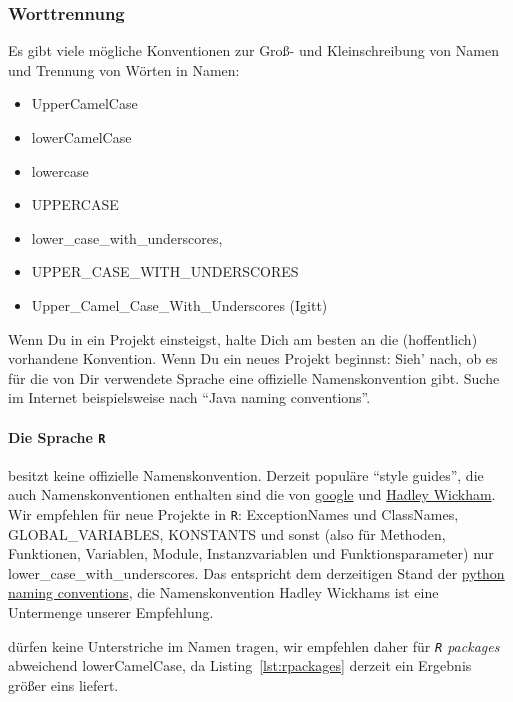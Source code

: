 \documentclass[twoside]{scrartcl}
\providecommand{\R}{\texttt{R}}
\begin{document}
\subsubsection{Worttrennung}
Es gibt viele m\"o{}gliche Konventionen zur Gro\ss{}- und Kleinschreibung  von
Namen und
Trennung von W\"o{}rten in Namen:
\begin{itemize}
\item UpperCamelCase
\item lowerCamelCase
\item lowercase
\item UPPERCASE
\item lower\_case\_with\_underscores,
\item UPPER\_CASE\_WITH\_UNDERSCORES
\item Upper\_Camel\_Case\_With\_Underscores (Igitt)
\end{itemize}
Wenn Du in ein Projekt einsteigst, halte Dich am besten an die (hoffentlich)
vorhandene Konvention.
Wenn Du ein neues Projekt beginnst: Sieh' nach, ob es f\"u{}r die von Dir 
verwendete Sprache eine offizielle Namenskonvention gibt. Suche im Internet 
beispielsweise nach "`Java naming conventions"'.

\paragraph{Die Sprache \R{}} besitzt keine offizielle
Namenskonvention. Derzeit
popul\"a{}re "`style guides"', die auch Namenskonventionen enthalten sind die
von
\href{https://google-styleguide.googlecode.com/svn/trunk/Rguide.xml}{google} und
\href{http://adv-r.had.co.nz/Style.html}{Hadley Wickham}.
Wir empfehlen f\"u{}r neue Projekte in \R{}: 
ExceptionNames und ClassNames, GLOBAL\_VARIABLES, KONSTANTS und sonst (also
f\"u{}r Methoden, Funktionen, Variablen, Module, Instanzvariablen und
Funktionsparameter) nur 
lower\_case\_with\_underscores.
Das entspricht dem derzeitigen Stand der
\href{http://legacy.python.org/dev/peps/pep-0008/#naming-conventions}{python
  naming conventions}, die Namenskonvention Hadley Wickhams ist eine
  Untermenge unserer Empfehlung.

 d\"urfen keine Unterstriche im Namen 
tragen, wir
empfehlen daher f\"u{}r \emph{\R{} packages} abweichend lowerCamelCase, 
da Listing~\ref{lst:rpackages} derzeit ein Ergebnis gr\"o{}\ss{}er eins 
liefert.

\end{document}
